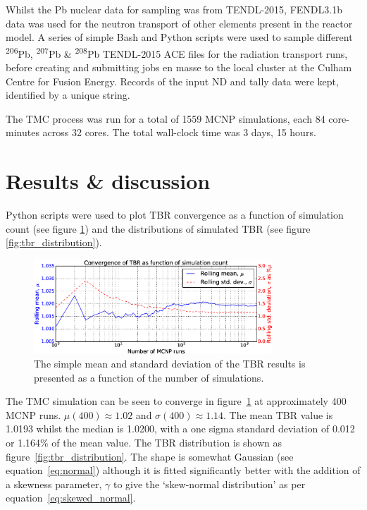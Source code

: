 Whilst the Pb nuclear data for sampling was from TENDL-2015, FENDL3.1b data was used for the neutron transport of other elements present in the reactor model. A series of simple Bash and Python scripts were used to sample different \textsuperscript{206}Pb, \textsuperscript{207}Pb \& \textsuperscript{208}Pb TENDL-2015 ACE files for the radiation transport runs, before creating and submitting jobs en masse to the local cluster at the Culham Centre for Fusion Energy. Records of the input ND and tally data were kept, identified by a unique string.

The TMC process was run for a total of 1559 MCNP simulations, each 84 core-minutes across 32 cores. The total wall-clock time was 3 days, 15 hours.

\section{Results \& discussion}
Python scripts were used to plot TBR convergence as a function of simulation count (see figure \ref{fig:convergence}) and the distributions of simulated TBR (see figure \ref{fig:tbr_distribution}).

\begin{figure}[H]
  \centering
	\includegraphics[width=0.8\textwidth]{hcll_convergence_1559}
	\caption{The simple mean and standard deviation of the TBR results is presented as a function of the number of simulations.}
	\label{fig:convergence}
\end{figure}

The TMC simulation can be seen to converge in figure~\ref{fig:convergence} at approximately 400 MCNP runs. $\mu(400) \approx 1.02$ and $\sigma(400) \approx 1.14$. The mean TBR value is 1.0193 whilst the median is 1.0200, with a one sigma standard deviation of 0.012 or 1.164\% of the mean value. The TBR distribution is shown as figure~\ref{fig:tbr_distribution}. The shape is somewhat Gaussian (see equation~\ref{eq:normal}) although it is fitted significantly better with the addition of a skewness parameter, $\gamma$ to give the `skew-normal distribution' as per equation~\ref{eq:skewed_normal}. 

